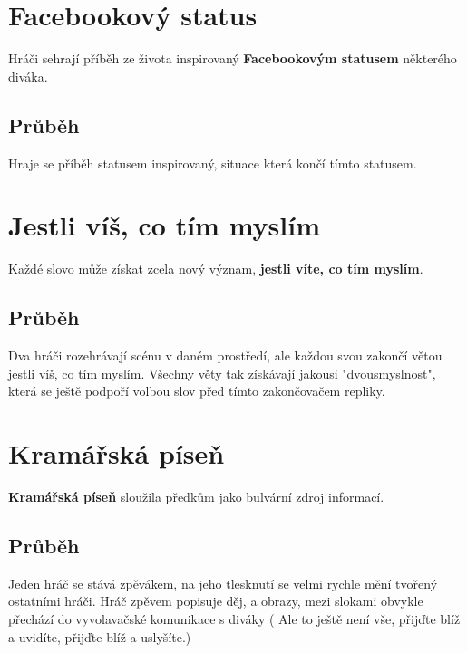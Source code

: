 \documentclass[main.tex]{subfiles}
\begin{document}
 
 
\needspace{5cm} \section{Facebookový status} \label{facebookový status}  
 
Hráči sehrají příběh ze života inspirovaný  \textbf{Facebookovým statusem}{} některého diváka. 
 
\subsection{Průběh} Hraje se příběh statusem inspirovaný, situace která končí tímto statusem.  
 
 
 
\needspace{5cm} \section{Jestli víš, co tím myslím} \label{jestli víš, co tím myslím}  
 
Každé slovo může získat zcela nový význam, \textbf{jestli víte, co tím myslím}{}. 
 
\subsection{Průběh} Dva hráči rozehrávají scénu v daném prostředí, ale každou svou  zakončí  
větou jestli víš, co tím myslím. Všechny věty tak získávají jakousi "dvousmyslnost", která se ještě podpoří volbou slov před tímto zakončovačem repliky.   
 
 
 
\needspace{5cm} \section{Kramářská píseň} \label{kramářská píseň}  
 
\textbf{Kramářská píseň}{} sloužila předkům jako bulvární zdroj informací. 
 
\subsection{Průběh} Jeden hráč se stává zpěvákem, na jeho tlesknutí se velmi rychle mění  tvořený ostatními hráči. 
Hráč zpěvem popisuje děj, a obrazy, mezi slokami obvykle přechází do vyvolavačské komunikace s diváky ( Ale to ještě není vše, přijďte blíž a uvidíte, přijďte blíž a uslyšíte.) 
 
\end{document}
